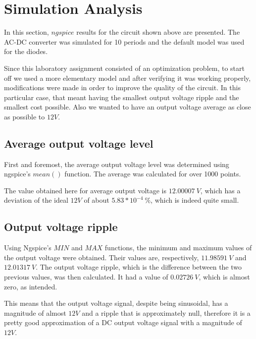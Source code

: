 \section{Simulation Analysis}
\label{sec:simulation}

In this section, $ngspice$ results for the circuit shown above are presented. The AC-DC converter was simulated for 10 periods and the default model was used for the diodes.

Since this laboratory assignment consisted of an optimization problem, to start off we used a more elementary model and after verifying it was working properly, modifications were made in order to improve the quality of the circuit. In this particular case, that meant having the smallest output voltage ripple and the smallest cost possible. Also we wanted to have an output voltage average as close as possible to  $12 V$.




\subsection{Average output voltage level}
First and foremost, the average output voltage level was determined using ngspice's $mean()$ function. The average was calculated for over 1000 points.

The value obtained here for average output voltage is $12.00007 \ V$,
which has a deviation of the ideal $12 V$ of about $5.83*10^{-4} \ \%$, which is indeed quite small.




\subsection{Output voltage ripple}
Using Ngspice's $MIN$ and $MAX$ functions, the minimum and maximum values of the output voltage were obtained. Their values are, respectively, $11.98591 \ V$ and $12.01317 \ V$. The output voltage ripple, which is the difference between the two previous values, was then calculated. It had a value of $0.02726 \ V$, which is almost zero, as intended.


This means that the output voltage signal, despite being sinusoidal, has a magnitude of almost $12 V$ and a ripple that is approximately null, therefore it is a pretty good approximation of a DC output voltage signal with a magnitude of $12 V$.





